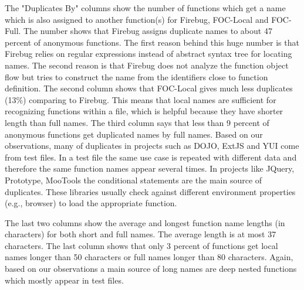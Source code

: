 \documentclass[10pt, preprint]{sigplanconf}
\begin{document}
The "Duplicates By" columns show the number of functions which get a name which is also assigned to another function(s) for Firebug, FOC-Local and FOC-Full. The number shows that Firebug assigns duplicate names to about 47 percent of anonymous functions. The first reason behind this huge number is that Firebug relies on regular expressions instead of abstract syntax tree for locating names. The second reason is that Firebug does not analyze the function object flow but tries to construct the name from the identifiers close to function definition. The second column shows that FOC-Local gives much less duplicates (13\%) comparing to Firebug. This means that local names are sufficient for recognizing functions within a file, which is helpful because they have shorter length than full names. The third column says that less than 9 percent of anonymous functions get duplicated names by full names. Based on our observations, many of duplicates in projects such as DOJO, ExtJS and YUI come from test files. In a test file the same use case is repeated with different data and therefore the same function names appear several times. In projects like JQuery, Prototype, MooTools the conditional statements are the main source of duplicates. These libraries usually check against different environment properties (e.g., browser) to load the appropriate function.

The last two columns show the average and longest function name lengths (in characters) for both short and full names. The average length is at most 37 characters. The last column shows that only 3 percent of functions get local names longer than 50 characters or full names longer than 80 characters. Again, based on our observations a main source of long names are deep nested functions which mostly appear in test files.



\end{document}
